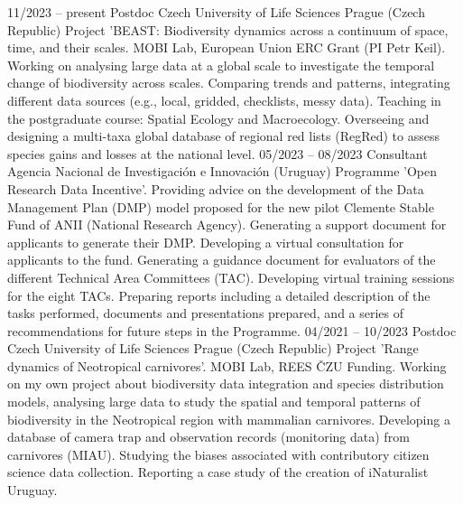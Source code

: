\documentclass[9pt]{developercv} %
\begin{document}


\begin{entrylist}
	\entry
		{11/2023 -- present}
		{Postdoc}
		{Czech University of Life Sciences Prague (Czech Republic)}
		{Project 'BEAST: Biodiversity dynamics across a continuum of space, time, and their scales. MOBI Lab, European Union ERC Grant (PI Petr Keil). Working on analysing large data at a global scale to investigate the temporal change of biodiversity across scales. Comparing trends and patterns, integrating different data sources (e.g., local, gridded, checklists, messy data). Teaching in the postgraduate course: Spatial Ecology and Macroecology. Overseeing and designing a multi-taxa global database of regional red lists (RegRed) to assess species gains and losses at the national level.}
	\entry
		{05/2023 -- 08/2023}
		{Consultant}
		{Agencia Nacional de Investigación e Innovación (Uruguay)}
		{Programme 'Open Research Data Incentive'. Providing advice on the development of the Data Management Plan (DMP) model proposed for the new pilot Clemente Stable Fund of ANII (National Research Agency). Generating a support document for applicants to generate their DMP. Developing a virtual consultation for applicants to the fund. Generating a guidance document for evaluators of the different Technical Area Committees (TAC). Developing virtual training sessions for the eight TACs. Preparing reports including a detailed description of the tasks performed, documents and presentations prepared, and a series of recommendations for future steps in the Programme.}
	\entry
		{04/2021 -- 10/2023}
		{Postdoc}
		{Czech University of Life Sciences Prague (Czech Republic)}
		{Project 'Range dynamics of Neotropical carnivores'. MOBI Lab, REES ČZU Funding. Working on my own project about biodiversity data integration and species distribution models, analysing large data to study the spatial and temporal patterns of biodiversity in the Neotropical region with mammalian carnivores. Developing a database of camera trap and observation records (monitoring data) from carnivores (MIAU). Studying the biases associated with contributory citizen science data collection. Reporting a case study of the creation of iNaturalist Uruguay.}

\end{entrylist}
\end{document}

